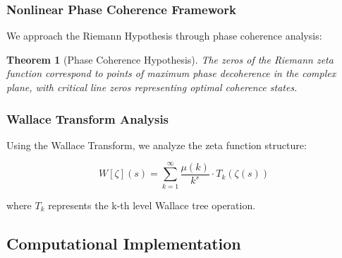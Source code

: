 \documentclass[12pt]{article}
\newtheorem{theorem}{Theorem}
\begin{document}
\subsubsection{Nonlinear Phase Coherence Framework}

We approach the Riemann Hypothesis through phase coherence analysis:

\begin{theorem}[Phase Coherence Hypothesis]
The zeros of the Riemann zeta function correspond to points of maximum phase decoherence in the complex plane, with critical line zeros representing optimal coherence states.
\end{theorem}

\subsubsection{Wallace Transform Analysis}

Using the Wallace Transform, we analyze the zeta function structure:

\begin{equation}
W[\zeta](s) = \sum_{k=1}^{\infty} \frac{\mu(k)}{k^s} \cdot T_k(\zeta(s))
\end{equation}

where $T_k$ represents the k-th level Wallace tree operation.

\subsection{Computational Implementation}
\end{document}
